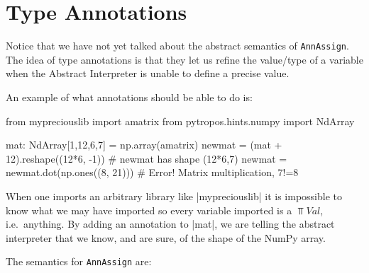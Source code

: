 \section{Type Annotations}

Notice that we have not yet talked about the abstract semantics of \texttt{AnnAssign}.
The idea of type annotations is that they let us refine the value/type of a variable when
the Abstract Interpreter is unable to define a precise value.

An example of what annotations should be able to do is:

\begin{pythoncode}
from mypreciouslib import amatrix
from pytropos.hints.numpy import NdArray

mat: NdArray[1,12,6,7] = np.array(amatrix)
newmat = (mat + 12).reshape((12*6, -1))  # newmat has shape (12*6,7)
newmat = newmat.dot(np.ones((8, 21)))  # Error! Matrix multiplication, 7!=8
\end{pythoncode}

When one imports an arbitrary library like \pycode|mypreciouslib| it is
impossible to know what we may have imported so every variable imported
is a \(\Top{Val}\), i.e.~anything. By adding an annotation to
\pycode|mat|, we are telling the abstract interpreter that we know, and
are sure, of the shape of the NumPy array.

The semantics for \texttt{AnnAssign} are:

